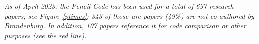 \documentclass[12pt]{article}
\begin{document}
{\em
As of April 2023, the {\sc Pencil Code} has been used for a total of
697 research papers; see Figure~\ref{ptimes};
343 of those are papers (49\%) are not co-authored by Brandenburg. %
In addition, 107 papers reference it for code comparison or other purposes %
(see the red line).
}
\end{document}
